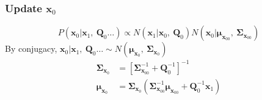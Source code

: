 \documentclass[]{article}
\begin{document}
\subsubsection{Update \(\mathbf{x}_{0}\)}
\[P\left( \mathbf{x}_{0}|\mathbf{x}_{1},\ \mathbf{Q}_{0}\ldots \right) \propto N(\mathbf{x}_{1}|\mathbf{x}_{0},\ \mathbf{Q}_{0})N(\mathbf{x}_{0}|\bm{\mu}_{\mathbf{x}_{00}},\ \mathbf{\Sigma}_{\mathbf{x}_{00}})\]
By conjugacy, \(\mathbf{x}_{0}|\mathbf{x}_{1},\ \mathbf{Q}_{0}\ldots \sim N(\bm{\mu}_{\mathbf{x}_{0}},\ \mathbf{\Sigma}_{\mathbf{x}_{0}})\)
\begin{align*}
	\mathbf{\Sigma}_{\mathbf{x}_{0}} &= \left\lbrack \mathbf{\Sigma}_{\mathbf{x}_{00}}^{- 1} + \mathbf{Q}_{0}^{- 1} \right\rbrack^{- 1}\\
	\bm{\mu}_{\mathbf{x}_{0}} &= \mathbf{\Sigma}_{\mathbf{x}_{0}}\left( \mathbf{\Sigma}_{\mathbf{x}_{00}}^{- 1}\bm{\mu}_{\mathbf{x}_{00}} + \mathbf{Q}_{0}^{- 1}\mathbf{x}_{1} \right)
\end{align*}
\end{document}
